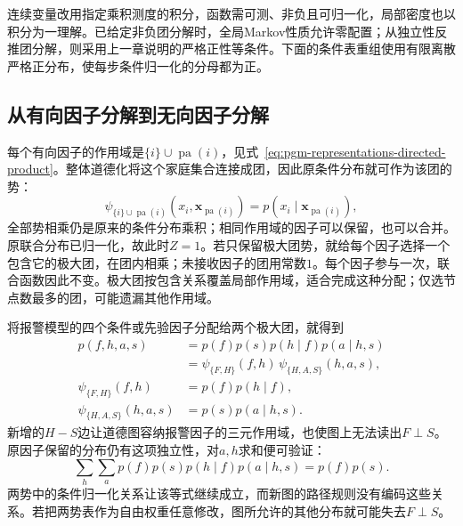 连续变量改用指定乘积测度的积分，函数需可测、非负且可归一化，局部密度也以积分为一理解。已给定非负团分解时，全局Markov性质允许零配置；从独立性反推团分解，则采用上一章说明的严格正性等条件。下面的条件表重组使用有限离散严格正分布，使每步条件归一化的分母都为正。

\subsection{从有向因子分解到无向因子分解}
\label{sec:pgm-representations-directed-to-undirected}

每个有向因子的作用域是$\{i\}\cup\operatorname{pa}(i)$，见式~\eqref{eq:pgm-representations-directed-product}。整体道德化将这个家庭集合连接成团，因此原条件分布就可作为该团的势：
\[
  \psi_{\{i\}\cup\operatorname{pa}(i)}
  (x_i,\bm{x}_{\operatorname{pa}(i)})
  =
  p(x_i\mid\bm{x}_{\operatorname{pa}(i)}),
\]
全部势相乘仍是原来的条件分布乘积；相同作用域的因子可以保留，也可以合并。原联合分布已归一化，故此时$Z=1$。若只保留极大团势，就给每个因子选择一个包含它的极大团，在团内相乘；未接收因子的团用常数$1$。每个因子参与一次，联合函数因此不变。极大团按包含关系覆盖局部作用域，适合完成这种分配；仅选节点数最多的团，可能遗漏其他作用域。

将报警模型的四个条件或先验因子分配给两个极大团，就得到
\begin{equation}
  \begin{aligned}
    p(f,h,a,s)&=p(f)p(s)p(h\mid f)p(a\mid h,s)\\
    &=\psi_{\{F,H\}}(f,h)\,
      \psi_{\{H,A,S\}}(h,a,s),\\
    \psi_{\{F,H\}}(f,h)&=p(f)p(h\mid f),\\
    \psi_{\{H,A,S\}}(h,a,s)&=p(s)p(a\mid h,s).
  \end{aligned}
  \label{eq:pgm-representations-alarm-potentials}
\end{equation}
新增的$H-S$边让道德图容纳报警因子的三元作用域，也使图上无法读出$F\perp S$。原因子保留的分布仍有这项独立性，对$a,h$求和便可验证：
\[
  \sum_h\sum_a p(f)p(s)p(h\mid f)p(a\mid h,s)
  =p(f)p(s).
\]
两势中的条件归一化关系让该等式继续成立，而新图的路径规则没有编码这些关系。若把两势表作为自由权重任意修改，图所允许的其他分布就可能失去$F\perp S$。

